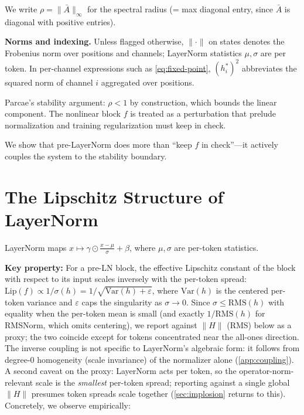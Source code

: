 \documentclass[11pt]{article}
\begin{document}
We write $\rho = \|\bar{A}\|_\infty$ for the spectral radius (= max diagonal entry, since $\bar{A}$ is diagonal with positive entries).

\textbf{Norms and indexing.} Unless flagged otherwise, $\|\cdot\|$ on states denotes the Frobenius norm over positions and channels; LayerNorm statistics $\mu, \sigma$ are per token. In per-channel expressions such as \cref{eq:fixed-point}, $(h^*_i)^2$ abbreviates the squared norm of channel $i$ aggregated over positions.

Parcae's stability argument: $\rho < 1$ by construction, which bounds the linear component. The nonlinear block $f$ is treated as a perturbation that prelude normalization and training regularization must keep in check.

We show that pre-LayerNorm does more than ``keep $f$ in check''---it actively couples the system to the stability boundary.


\section{The Lipschitz Structure of LayerNorm}
\label{sec:lipschitz}

LayerNorm maps $x \mapsto \gamma \odot \frac{x - \mu}{\sigma} + \beta$, where $\mu, \sigma$ are per-token statistics.

\textbf{Key property:} For a pre-LN block, the effective Lipschitz constant of the block with respect to its input scales inversely with the per-token spread: $\text{Lip}(f) \propto 1/\sigma(h) = 1/\sqrt{\text{Var}(h) + \varepsilon}$, where $\text{Var}(h)$ is the centered per-token variance and $\varepsilon$ caps the singularity as $\sigma \to 0$. Since $\sigma \le \text{RMS}(h)$ with equality when the per-token mean is small (and exactly $1/\text{RMS}(h)$ for RMSNorm, which omits centering), we report against $\|H\|$ (RMS) below as a proxy; the two coincide except for tokens concentrated near the all-ones direction. The inverse coupling is not specific to LayerNorm's algebraic form: it follows from degree-0 homogeneity (scale invariance) of the normalizer alone (\cref{app:coupling}). A second caveat on the proxy: LayerNorm acts per token, so the operator-norm-relevant scale is the \emph{smallest} per-token spread; reporting against a single global $\|H\|$ presumes token spreads scale together (\cref{sec:implosion} returns to this). Concretely, we observe empirically:
\end{document}
